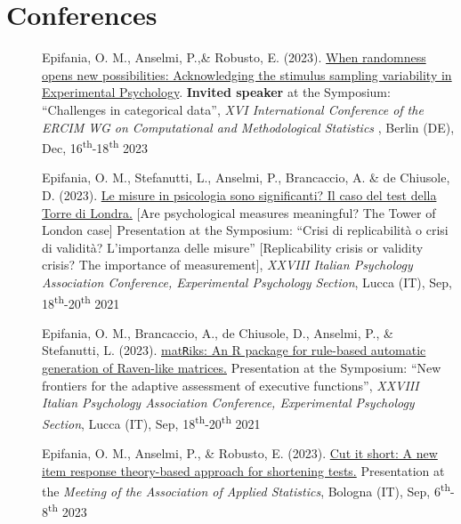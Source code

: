 \documentclass[letterpaper,12pt]{article}
\begin{document}
\section{Conferences}
\begin{description}
	
	
		\item[] Epifania, O. M., Anselmi, P.,\& Robusto, E. (2023). \href{https://ottaviae.github.io/presentations/Berlino2023/CMS-epifania.pdf}{When randomness opens new possibilities: Acknowledging the stimulus sampling variability in Experimental Psychology}. \textbf{Invited speaker} at the Symposium: ``Challenges in categorical data'',   \emph{XVI International Conference of the ERCIM WG on Computational and Methodological Statistics }, Berlin (DE), Dec, 16\textsuperscript{th}-18\textsuperscript{th} 2023
	
			\item[] Epifania, O. M., Stefanutti, L.,  Anselmi, P., Brancaccio, A. \& de Chiusole, D. (2023). \href{https://ottaviae.github.io/presentations/AIP2023/Simposio-validita/epifania-meaningfullness.pdf}{Le misure in psicologia sono significanti?
				Il caso del test della Torre di Londra.} [Are psychological measures meaningful? The Tower of London case] Presentation at the Symposium: ``Crisi di replicabilità o crisi di validità? L’importanza delle misure'' [Replicability crisis or validity crisis? The importance of measurement],   \emph{XXVIII Italian Psychology Association Conference, Experimental Psychology Section}, Lucca (IT), Sep, 18\textsuperscript{th}-20\textsuperscript{th} 2021
	
		\item[] Epifania, O. M., Brancaccio, A., de Chiusole, D., Anselmi, P., \& Stefanutti, L. (2023). \href{https://ottaviae.github.io/presentations/AIP2023/Simposio-PRIN/AIP-2023-epifania-matRiks.pdf}{mat\texttt{R}iks: An R package for rule-based automatic generation of Raven-like matrices.} Presentation at the Symposium: ``New frontiers for the adaptive assessment of executive functions'',   \emph{XXVIII Italian Psychology Association Conference, Experimental Psychology Section}, Lucca (IT), Sep, 18\textsuperscript{th}-20\textsuperscript{th} 2021
	
		\item[] Epifania, O. M., Anselmi, P., \& Robusto, E. (2023). \href{https://ottaviae.github.io/presentations/Bologna2023/Cut-it-short.pdf}{Cut it short: A new item response theory-based approach for shortening tests.} Presentation at the \emph{Meeting of the Association of Applied Statistics},  Bologna (IT), Sep, 6\textsuperscript{th}-8\textsuperscript{th} 2023
	

\end{description}
\end{document}
